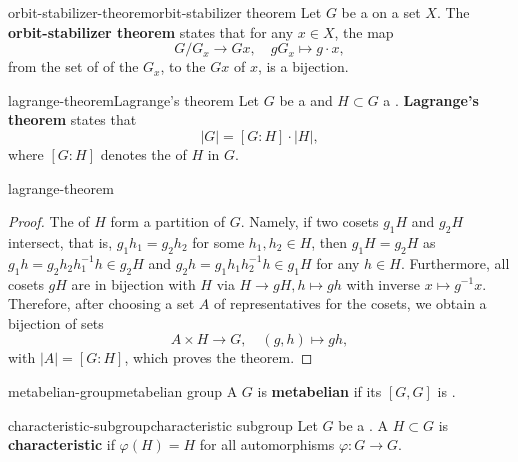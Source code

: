 \begin{topic}{orbit-stabilizer-theorem}{orbit-stabilizer theorem}
    Let $G$ be a   on a set $X$. The \textbf{orbit-stabilizer theorem} states that for any $x \in X$, the map
    \[ G/G_x \to Gx , \quad g G_x \mapsto g \cdot x , \]
    from the set of  of the  $G_x$, to the  $Gx$ of $x$, is a bijection.
\end{topic}

\begin{topic}{lagrange-theorem}{Lagrange's theorem}
    Let $G$ be a  and $H \subset G$ a . \textbf{Lagrange's theorem} states that
    \[ |G| = [G : H] \cdot |H| , \]
    where $[G : H]$ denotes the  of $H$ in $G$.
\end{topic}

\begin{example}{lagrange-theorem}
    \begin{proof}
        The  of $H$ form a partition of $G$. Namely, if two cosets $g_1 H$ and $g_2 H$ intersect, that is, $g_1 h_1 = g_2 h_2$ for some $h_1, h_2 \in H$, then $g_1 H = g_2 H$ as $g_1 h = g_2 h_2 h_1^{-1} h \in g_2 H$ and $g_2 h = g_1 h_1 h_2^{-1} h \in g_1 H$ for any $h \in H$. Furthermore, all cosets $gH$ are in bijection with $H$ via $H \to gH, h \mapsto g h$ with inverse $x \mapsto g^{-1} x$. Therefore, after choosing a set $A$ of representatives for the cosets, we obtain a bijection of sets
        \[ A \times H \to G, \quad (g, h) \mapsto gh , \]
        with $|A| = [G : H]$, which proves the theorem.
    \end{proof}
\end{example}

\begin{topic}{metabelian-group}{metabelian group}
    A  $G$ is \textbf{metabelian} if its  $[G, G]$ is .
\end{topic}

\begin{topic}{characteristic-subgroup}{characteristic subgroup}
    Let $G$ be a . A  $H \subset G$ is \textbf{characteristic} if $\varphi(H) = H$ for all automorphisms $\varphi \colon G \to G$.
\end{topic}

